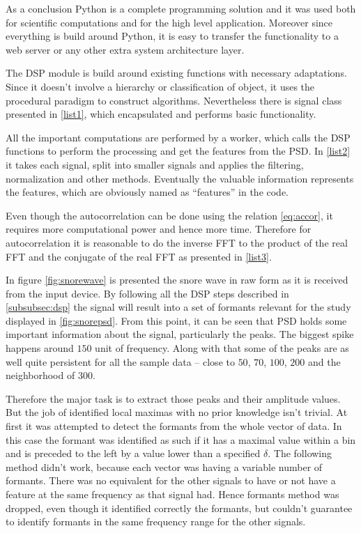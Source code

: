 As a conclusion Python is a complete programming solution and it was used both for scientific computations and for the high level application. Moreover since everything is build around Python, it is easy to transfer the functionality to a web server or any other extra system architecture layer.

The DSP module is build around existing functions with necessary adaptations. Since it doesn't involve a hierarchy or classification of object, it uses the procedural paradigm to construct algorithms. Nevertheless there is signal class presented in \ref{list1}, which encapsulated and performs basic functionality.

All the important computations are performed by a worker, which calls the DSP functions to perform the processing and get the features from the PSD. In \ref{list2} it takes each signal, split into smaller signals and applies the filtering, normalization and other methods. Eventually the valuable information represents the features, which are obviously named as ``features'' in the code.



Even though the autocorrelation can be done using the relation \eqref{eq:accor}, it requires more computational power and hence more time. Therefore for autocorrelation it is reasonable to do the inverse FFT to the product of the real FFT and the conjugate of the real FFT as presented in \ref{list3}.



In figure \ref{fig:snorewave} is presented the snore wave in raw form as it is received from the input device. By following all the DSP steps described in \ref{subsubsec:dsp} the signal will result into a set of formants relevant for the study displayed in \ref{fig:snorepsd}. From this point, it can be seen that PSD holds some important information about the signal, particularly the peaks. The biggest spike happens around $150$ unit of frequency. Along with that some of the peaks are as well quite persistent for all the sample data -- close to $50$, $70$, $100$, $200$ and the neighborhood of $300$. 

Therefore the major task is to extract those peaks and their amplitude values. But the job of identified local maximas with no prior knowledge isn't trivial. At first it was attempted to detect the formants from the whole vector of data. In this case the formant was identified as such if it has a maximal value within a bin and is preceded to the left by a value lower than a specified $\delta$. The following method didn't work, because each vector was having a variable number of formants. There was no equivalent for the other signals to have or not have a feature at the same frequency as that signal had. Hence formants method was dropped, even though it identified correctly the formants, but couldn't guarantee to identify formants in the same frequency range for the other signals.

